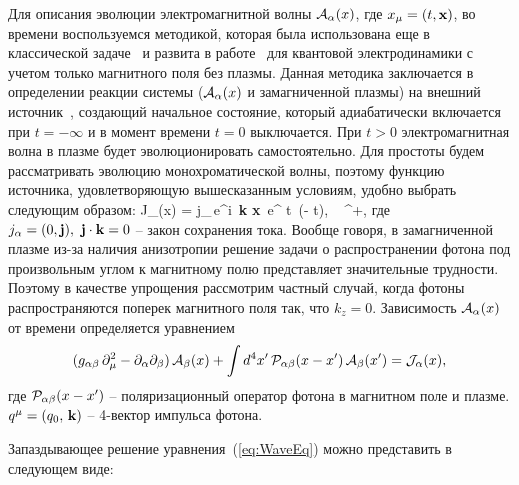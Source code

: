 Для описания эволюции электромагнитной волны ${\cal A}_{\alpha}(x)$, где $x_\mu = (t, {\bf x})$, 
во времени воспользуемся методикой, которая была использована еще в классической задаче~\cite{Landau:1946} и развита  в работе~\cite{MikhChist:2001} для квантовой электродинамики с учетом только магнитного поля без плазмы. Данная методика заключается в определении реакции системы 
(${\cal A}_{\alpha}(x)$ и замагниченной плазмы) на внешний источник~\cite{Kirzhnits:1987}, создающий начальное состояние, который адиабатически включается 
при $t = - \infty$ и в момент времени $t = 0$ выключается. При $t > 0$
электромагнитная волна в плазме будет эволюционировать самостоятельно. Для простоты будем рассматривать эволюцию монохроматической волны, поэтому 
функцию источника, удовлетворяющую вышесказанным условиям, удобно выбрать следующим образом:
%
\beq
{\cal J}_{\alpha}(x) = j_{\alpha}\,e^{i \,{\bf k} {\bf x}}\,
e^{ \varepsilon t}\, \theta(- t), \,\,\, \varepsilon {}^+,
\label{eq:1}
\eeq
где $j_{\alpha} = (0, {\bf j}),\,\,{\bf j} \cdot {\bf k} = 0$ – закон сохранения тока. Вообще говоря, в замагниченной плазме из-за наличия анизотропии решение задачи о распространении фотона под произвольным углом к магнитному полю представляет значительные трудности. Поэтому в качестве упрощения рассмотрим частный случай, когда фотоны распространяются поперек магнитного поля так, что $k_z=0$. Зависимость ${\cal A}_{\alpha}(x)$ от времени  определяется уравнением
%
\begin{eqnarray}\label{eq:WaveEq}
(g_{\alpha \beta} \, \partial_{\mu}^2  -
\partial_{\alpha}\partial_{\beta}) \, {\cal A}_{\beta}(x) + 
\int d^4 x'\, {\cal P}_{\alpha \beta} (x - x') \, {\cal A}_{\beta}(x')
= {\cal J}_{\alpha}(x),
\label{eq:2}
\end{eqnarray}
где ${\cal P}_{\alpha \beta} (x - x')$ -- поляризационный оператор фотона в магнитном поле и плазме. $q^{\mu} = (q_0,\, {\bf k})$ -- 4-вектор импульса фотона.



Запаздывающее решение уравнения~(\ref{eq:WaveEq}) можно представить в следующем виде:

